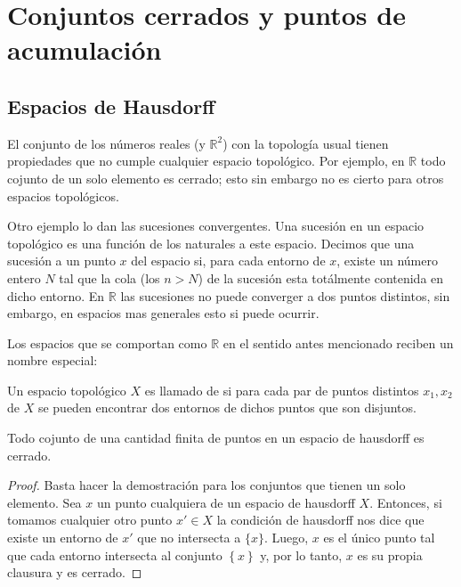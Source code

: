 \chapter{Conjuntos cerrados y puntos de acumulación}%
\label{cha:Conjuntos cerrados y puntos de acmulación}

\section{Espacios de Hausdorff}%
\label{sec:Espacios de Hausdorff}

El conjunto de los números reales (y $\mathbb{R}^2$) con la topología usual
tienen propiedades que no cumple cualquier espacio topológico. Por ejemplo,
en $\mathbb{R}$ todo cojunto de un solo elemento es cerrado; esto sin embargo no 
es cierto para otros espacios topológicos.

Otro ejemplo lo dan las sucesiones convergentes. Una sucesión en un espacio topológico es
una función de los naturales a este espacio. Decimos que una sucesión 
a un punto $x$ del espacio si, para cada entorno de $x$, existe un número entero $N$
tal que la cola (los $n>N$) de la sucesión esta totálmente contenida en dicho entorno.
En $\mathbb{R}$ las sucesiones no puede converger a dos puntos distintos, sin embargo,
en espacios mas generales esto si puede ocurrir.

Los espacios que se comportan como $\mathbb{R}$ en el sentido antes mencionado reciben un
nombre especial:

\begin{defi}
	Un espacio topológico $X$ es llamado de  si para cada par
	de puntos distintos $x_{1},x_2$ de $X$ se pueden encontrar dos entornos de
	dichos puntos que son disjuntos.
\end{defi}

\begin{teo}
	Todo cojunto de una cantidad finita de puntos en un espacio de hausdorff es cerrado.
\end{teo}

\begin{proof}
	Basta hacer la demostración para los conjuntos que tienen un solo elemento.
	Sea $x$ un punto cualquiera de un espacio de hausdorff $X$. Entonces, si tomamos cualquier otro punto
	$x'\in X$ la condición de hausdorff nos dice que existe un entorno de $x'$ que no intersecta a $\{x\}$. Luego,
	$x$ es el único punto tal que cada entorno intersecta al conjunto $\left\{ x \right\}$ y, por lo tanto,
	$x$ es su propia clausura y es cerrado.
\end{proof}
